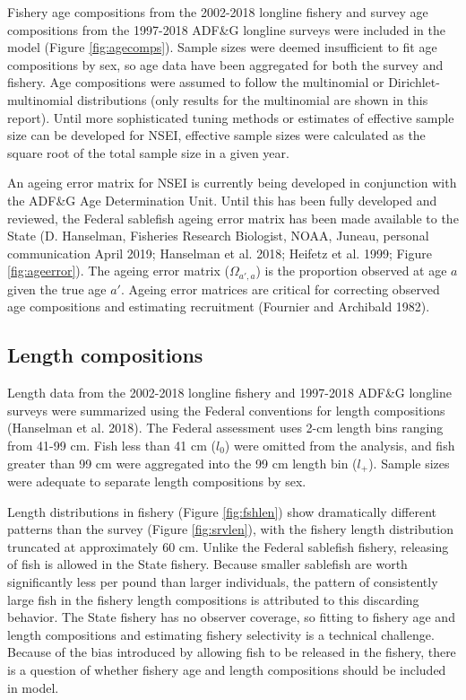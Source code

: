 \documentclass[]{article}
\begin{document}
Fishery age compositions from the 2002-2018 longline fishery and survey
age compositions from the 1997-2018 ADF\&G longline surveys were
included in the model (Figure \ref{fig:agecomps}). Sample sizes were
deemed insufficient to fit age compositions by sex, so age data have
been aggregated for both the survey and fishery. Age compositions were
assumed to follow the multinomial or Dirichlet-multinomial distributions
(only results for the multinomial are shown in this report). Until more
sophisticated tuning methods or estimates of effective sample size can
be developed for NSEI, effective sample sizes were calculated as the
square root of the total sample size in a given year.

An ageing error matrix for NSEI is currently being developed in
conjunction with the ADF\&G Age Determination Unit. Until this has been
fully developed and reviewed, the Federal sablefish ageing error matrix
has been made available to the State (D. Hanselman, Fisheries Research
Biologist, NOAA, Juneau, personal communication April 2019; Hanselman et
al. 2018; Heifetz et al. 1999; Figure \ref{fig:ageerror}). The ageing
error matrix (\(\Omega_{a',a}\)) is the proportion observed at age \(a\)
given the true age \(a'\). Ageing error matrices are critical for
correcting observed age compositions and estimating recruitment
(Fournier and Archibald 1982).

\subsection{Length compositions}\label{length-compositions}

Length data from the 2002-2018 longline fishery and 1997-2018 ADF\&G
longline surveys were summarized using the Federal conventions for
length compositions (Hanselman et al. 2018). The Federal assessment uses
2-cm length bins ranging from 41-99 cm. Fish less than 41 cm (\(l_0\))
were omitted from the analysis, and fish greater than 99 cm were
aggregated into the 99 cm length bin (\(l_{+}\)). Sample sizes were
adequate to separate length compositions by sex.

Length distributions in fishery (Figure \ref{fig:fshlen}) show
dramatically different patterns than the survey (Figure
\ref{fig:srvlen}), with the fishery length distribution truncated at
approximately 60 cm. Unlike the Federal sablefish fishery, releasing of
fish is allowed in the State fishery. Because smaller sablefish are
worth significantly less per pound than larger individuals, the pattern
of consistently large fish in the fishery length compositions is
attributed to this discarding behavior. The State fishery has no
observer coverage, so fitting to fishery age and length compositions and
estimating fishery selectivity is a technical challenge. Because of the
bias introduced by allowing fish to be released in the fishery, there is
a question of whether fishery age and length compositions should be
included in model.
\end{document}
